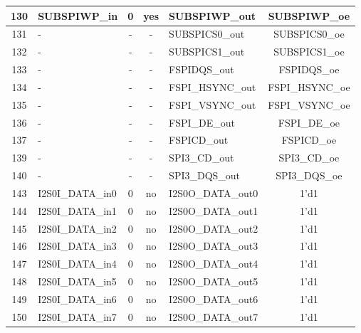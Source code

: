 \begin{longtable}[c]{|c|l|c|c|l|c|}
130  &             SUBSPIWP\_in  &  0  &  yes  &           SUBSPIWP\_out  &       SUBSPIWP\_oe  \\\hline
131  &                        -  &  -  &    -  &          SUBSPICS0\_out  &      SUBSPICS0\_oe  \\\hline
132  &                        -  &  -  &    -  &          SUBSPICS1\_out  &      SUBSPICS1\_oe  \\\hline
133  &                        -  &  -  &    -  &            FSPIDQS\_out  &        FSPIDQS\_oe  \\\hline
134  &                        -  &  -  &    -  &        FSPI\_HSYNC\_out  &    FSPI\_HSYNC\_oe  \\\hline
135  &                        -  &  -  &    -  &        FSPI\_VSYNC\_out  &    FSPI\_VSYNC\_oe  \\\hline
136  &                        -  &  -  &    -  &           FSPI\_DE\_out  &       FSPI\_DE\_oe  \\\hline
137  &                        -  &  -  &    -  &             FSPICD\_out  &         FSPICD\_oe  \\\hline
139  &                        -  &  -  &    -  &           SPI3\_CD\_out  &       SPI3\_CD\_oe  \\\hline
140  &                        -  &  -  &    -  &          SPI3\_DQS\_out  &      SPI3\_DQS\_oe  \\\hline
143  &         I2S0I\_DATA\_in0  &  0  &   no  &       I2S0O\_DATA\_out0  &               1'd1  \\\hline
144  &         I2S0I\_DATA\_in1  &  0  &   no  &       I2S0O\_DATA\_out1  &               1'd1  \\\hline
145  &         I2S0I\_DATA\_in2  &  0  &   no  &       I2S0O\_DATA\_out2  &               1'd1  \\\hline
146  &         I2S0I\_DATA\_in3  &  0  &   no  &       I2S0O\_DATA\_out3  &               1'd1  \\\hline
147  &         I2S0I\_DATA\_in4  &  0  &   no  &       I2S0O\_DATA\_out4  &               1'd1  \\\hline
148  &         I2S0I\_DATA\_in5  &  0  &   no  &       I2S0O\_DATA\_out5  &               1'd1  \\\hline
149  &         I2S0I\_DATA\_in6  &  0  &   no  &       I2S0O\_DATA\_out6  &               1'd1  \\\hline
150  &         I2S0I\_DATA\_in7  &  0  &   no  &       I2S0O\_DATA\_out7  &               1'd1  \\\hline

\end{longtable}

